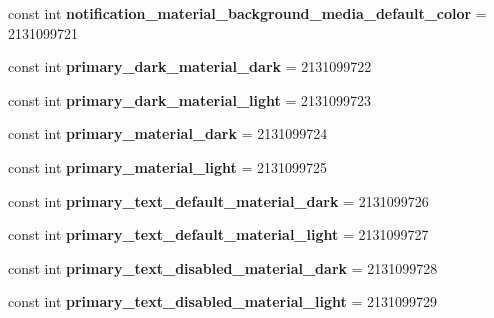 \begin{DoxyCompactItemize}
const int {\bfseries notification\+\_\+material\+\_\+background\+\_\+media\+\_\+default\+\_\+color} = 2131099721
\item 
\mbox{\label{classst_delivery_1_1_resource_1_1_color_a8591f617a3901016228d114bfc84b6a9}} 
const int {\bfseries primary\+\_\+dark\+\_\+material\+\_\+dark} = 2131099722
\item 
\mbox{\label{classst_delivery_1_1_resource_1_1_color_a6b5736ab038e66aec6df7c0cba70d9a7}} 
const int {\bfseries primary\+\_\+dark\+\_\+material\+\_\+light} = 2131099723
\item 
\mbox{\label{classst_delivery_1_1_resource_1_1_color_a5e29dc94c2646595edf784cc3287cbf1}} 
const int {\bfseries primary\+\_\+material\+\_\+dark} = 2131099724
\item 
\mbox{\label{classst_delivery_1_1_resource_1_1_color_af511a2d555a88f3a11a876d954ab6be7}} 
const int {\bfseries primary\+\_\+material\+\_\+light} = 2131099725
\item 
\mbox{\label{classst_delivery_1_1_resource_1_1_color_a4f454f269723d030d50acbe74cdec7da}} 
const int {\bfseries primary\+\_\+text\+\_\+default\+\_\+material\+\_\+dark} = 2131099726
\item 
\mbox{\label{classst_delivery_1_1_resource_1_1_color_a64ed78c9ad43845e57db94a4bfcb0f7a}} 
const int {\bfseries primary\+\_\+text\+\_\+default\+\_\+material\+\_\+light} = 2131099727
\item 
\mbox{\label{classst_delivery_1_1_resource_1_1_color_a3da7f0b38370fd20700bfd533db0df2f}} 
const int {\bfseries primary\+\_\+text\+\_\+disabled\+\_\+material\+\_\+dark} = 2131099728
\item 
\mbox{\label{classst_delivery_1_1_resource_1_1_color_adae7316c8b1f2d4e55bbebad1b894e31}} 
const int {\bfseries primary\+\_\+text\+\_\+disabled\+\_\+material\+\_\+light} = 2131099729
\item 

\end{DoxyCompactItemize}
